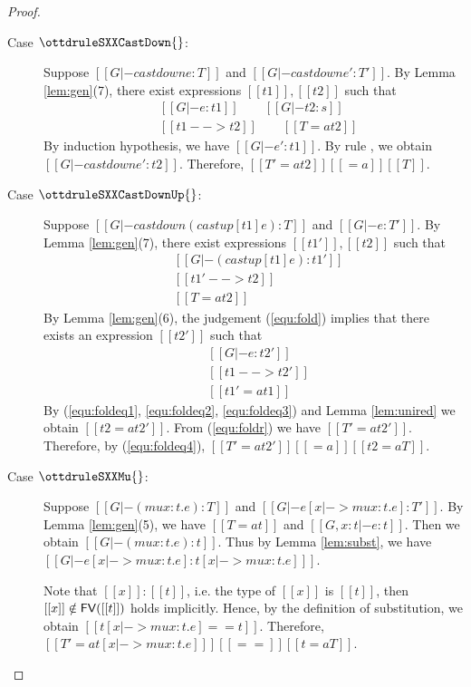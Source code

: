 \begin{proof}
\begin{description}
        \item[Case $\ottdruleSXXCastDown{}$:] $\quad$ \\
        Suppose $[[G |- castdown e :T]]$ and $[[G |- castdown e' :T']]$. By Lemma \ref{lem:gen}(7), there exist expressions $[[t1]], [[t2]]$ such that 
        \begin{align*}
            &[[G |- e:t1]] \qquad [[G |- t2:s]] \\
            &[[t1 --> t2]] \qquad [[T =a t2 ]]
        \end{align*}
        By induction hypothesis, we have $[[G |- e':t1]]$. By rule , we obtain $[[G |- castdown e' : t2 ]]$. Therefore, $[[T' =a t2]] [[=a]] [[T]]$.
        
        \item[Case $\ottdruleSXXCastDownUp{}$:] $\quad$ \\
        Suppose $[[G |- castdown (castup [t1] e) :T]]$ and $[[G |- e :T']]$. By Lemma \ref{lem:gen}(7), there exist expressions $[[t1']], [[t2]]$ such that 
        \begin{align}
            &[[G |- (castup [t1] e):t1']] \label{equ:fold} \\
            &[[t1' --> t2]] \label{equ:foldeq1} \\
            &[[T =a t2 ]] \label{equ:foldeq4}
        \end{align}
        By Lemma \ref{lem:gen}(6), the judgement (\ref{equ:fold}) implies that there exists an expression $[[t2']]$ such that
        \begin{align}
            &[[G |- e:t2']] \label{equ:foldr} \\
            &[[t1 --> t2']] \label{equ:foldeq2} \\
            &[[t1' =a t1]] \label{equ:foldeq3}
        \end{align}
        By (\ref{equ:foldeq1}, \ref{equ:foldeq2}, \ref{equ:foldeq3}) and Lemma \ref{lem:unired} we obtain $[[t2 =a t2']]$. From (\ref{equ:foldr}) we have $[[T' =a t2' ]]$. Therefore, by (\ref{equ:foldeq4}), $[[T' =a t2' ]] [[=a]] [[t2 =a T]]$.
        
        \item[Case $\ottdruleSXXMu{}$:] $\quad$ \\
        Suppose $[[G |- (mu x:t.e) :T]]$ and $[[G |- e[x |-> mu x:t.e] :T']]$. By Lemma \ref{lem:gen}(5), we have $[[T =a t]]$ and $[[G, x:t |- e:t]]$. Then we obtain $[[G |- (mu x:t.e) : t]]$. Thus by Lemma \ref{lem:subst}, we have $[[G |- e[x |-> mu x:t.e] : t[x |-> mu x:t.e] ]]$.
        
        Note that $[[x]]:[[t]]$, i.e. the type of $[[x]]$ is $[[t]]$, then $[[x]] \notin \mathsf{FV}([[t]])$ holds implicitly. Hence, by the definition of substitution, we obtain $[[t[x |-> mu x:t.e] == t]]$. Therefore, $[[T' =a t[x |-> mu x:t.e] ]] [[==]] [[t =a T]]$.
    \end{description}
\end{proof}

